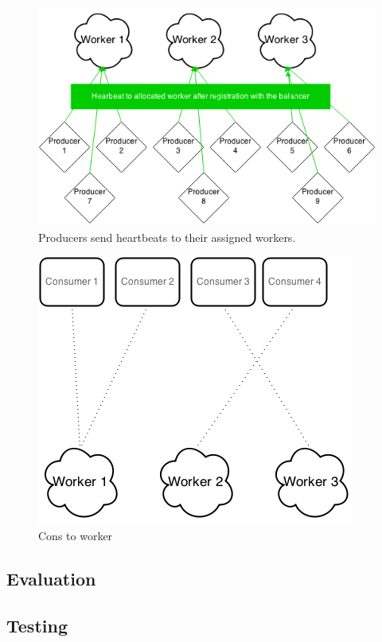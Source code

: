 \documentclass{sigchi}
\begin{document}
\begin{figure}[!h]
\centering
\includegraphics[width=0.9\columnwidth]{img/heartbeat}
\caption{Producers send heartbeats to their assigned workers.}
\label{fig:heartbeat}
\end{figure}

\begin{figure}[!h]
\centering
\includegraphics[width=0.9\columnwidth]{img/cons_to_worker}
\caption{Cons to worker}
\label{fig:cons_to_worker}
\end{figure}

\subsection{Evaluation}

\subsection{Testing}
\end{document}
